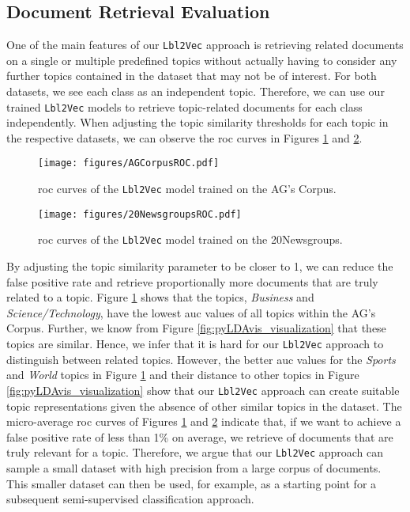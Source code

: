 \documentclass[a4paper,twoside]{article}
\begin{document}
\subsection{Document Retrieval Evaluation}\label{ROC_eval_section}
One of the main features of our \texttt{Lbl2Vec} approach is retrieving related documents on a single or multiple predefined topics without actually having to consider any further topics contained in the dataset that may not be of interest. For both datasets, we see each class as an independent topic. Therefore, we can use our trained \texttt{Lbl2Vec} models to retrieve topic-related documents for each class independently. When adjusting the topic similarity thresholds  for each topic  in the respective datasets, we can observe the \ac{roc} curves in Figures \ref{fig:AGCorpus_ROC} and \ref{fig:20Newsgroups_ROC}.
\begin{figure}[ht]
    \centering
    \texttt{[image: figures/AGCorpusROC.pdf]}
    \caption{\ac{roc} curves of the \texttt{Lbl2Vec} model trained on the AG's Corpus.}
    \label{fig:AGCorpus_ROC}
\end{figure}
\begin{figure}[ht]
    \centering
    \texttt{[image: figures/20NewsgroupsROC.pdf]}
    \caption{\ac{roc} curves of the \texttt{Lbl2Vec} model trained on the 20Newsgroups.}
    \label{fig:20Newsgroups_ROC}
\end{figure}
By adjusting the topic similarity parameter  to be closer to 1, we can reduce the false positive rate and retrieve proportionally more documents that are truly related to a topic. Figure \ref{fig:AGCorpus_ROC} shows that the topics, \textit{Business} and \textit{Science/Technology}, have the lowest \ac{auc} values of all topics within the AG's Corpus. Further, we know from Figure \ref{fig:pyLDAvis_visualization} that these topics are similar. Hence, we infer that it is hard for our \texttt{Lbl2Vec} approach to distinguish between related topics. However, the better \ac{auc} values for the \textit{Sports} and \textit{World} topics in Figure \ref{fig:AGCorpus_ROC} and their distance to other topics in Figure \ref{fig:pyLDAvis_visualization} show that our \texttt{Lbl2Vec} approach can create suitable topic representations given the absence of other similar topics in the dataset. The micro-average \ac{roc} curves of Figures \ref{fig:AGCorpus_ROC} and \ref{fig:20Newsgroups_ROC} indicate that, if we want to achieve a false positive rate of less than 1\% on average, we retrieve  of documents that are truly relevant for a topic. Therefore, we argue that our \texttt{Lbl2Vec} approach can sample a small dataset with high precision from a large corpus of documents. This smaller dataset can then be used, for example, as a starting point for a subsequent semi-supervised classification approach.
\end{document}
